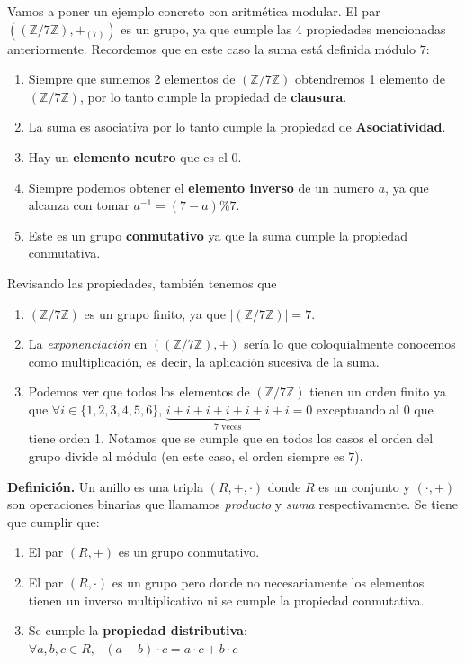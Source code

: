 \vspace{1em}
\newcommand{\zSiete}{(\mathbb{Z}/7\mathbb{Z})}

Vamos a poner un ejemplo concreto con aritmética modular. El par $(\zSiete, +_{(7)})$ es un grupo, ya que cumple las 4 propiedades mencionadas anteriormente. Recordemos que en este caso la suma está definida módulo $7$:
\begin{enumerate}
    \item Siempre que sumemos 2 elementos de $\zSiete$ obtendremos 1 elemento de $\zSiete$, por lo tanto cumple la propiedad de \textbf{clausura}.
    \item La suma es asociativa por lo tanto cumple la propiedad de \textbf{Asociatividad}.
    \item Hay un \textbf{elemento neutro} que es el $0$.
    \item Siempre podemos obtener el \textbf{elemento inverso} de un numero $a$, ya que alcanza con tomar $a^{-1}=(7-a)\%7$.
    \item Este es un grupo \textbf{conmutativo} ya que la suma cumple la propiedad conmutativa. 
\end{enumerate}
Revisando las propiedades, también tenemos que 
\begin{enumerate}
    \item $\zSiete$ es un grupo finito, ya que $|\zSiete| = 7$. 
    \item La \textit{exponenciación} en $(\zSiete, +)$ sería lo que coloquialmente conocemos como multiplicación, es decir, la aplicación sucesiva de la suma. 
    \item Podemos ver que todos los elementos de $\zSiete$ tienen un orden finito ya que $\forall i \in \{1,2,3,4,5,6\}$, $\underbrace{i+i+i+i+i+i+i}_{7 \text{ veces}} = 0$ exceptuando al 0 que tiene orden 1. Notamos que se cumple que en todos los casos el orden del grupo divide al módulo (en este caso, el orden siempre es $7$).
\end{enumerate}

\vspace{2em}

\textbf{Definición.} Un anillo es una tripla $(R, +, \cdot)$ donde $R$ es un conjunto y $(\cdot, +)$ son operaciones binarias que llamamos \textit{producto} y \textit{suma} respectivamente. Se tiene que cumplir que:
\begin{enumerate}
    \item El par $(R,+)$ es un grupo conmutativo.
    \item El par $(R,\cdot)$ es un grupo pero donde no necesariamente los elementos tienen un inverso multiplicativo ni se cumple la propiedad conmutativa.
    \item Se cumple la \textbf{propiedad distributiva}: $\forall a,b,c \in R,~~~(a+b)\cdot c = a\cdot c + b\cdot c$
\end{enumerate}

